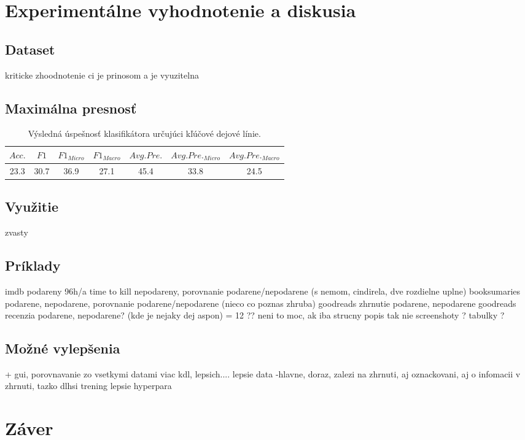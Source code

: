 \chapter{Experimentálne vyhodnotenie a diskusia}
\label{experimenty}


\section{Dataset}
kriticke zhoodnotenie ci je prinosom a je vyuzitelna

\section{Maximálna presnosť}

\begin{table}[hbt]
\centering
\caption{Výsledná úspešnosť klasifikátora určujúci kľúčové dejové línie.}
\label{vysledky}
\begin{tabular}{|c|c|c|c|c|c|c|}
\hline
\(Acc.\) & \(F1\) & \(F1_{Micro}\) & \(F1_{Macro}\) & \(Avg. Pre.\) & \(Avg. Pre._{Micro}\) &  \(Avg. Pre._{Macro}\) \\
\hline
23.3 & 30.7 & 36.9 & 27.1 & 45.4 & 33.8 & 24.5 \\ 
\hline

\end{tabular}
\end{table}

\section{Využitie}
zvasty


\section{Príklady}
imdb podareny 96h/a time to kill nepodareny, porovnanie podarene/nepodarene (s nemom, cindirela, dve rozdielne uplne)
booksumaries podarene, nepodarene, porovnanie podarene/nepodarene (nieco co poznas zhruba)
goodreads zhrnutie podarene, nepodarene
goodreads recenzia podarene, nepodarene? (kde je nejaky dej aspon)
= 12 ?? neni to moc, ak iba strucny popis tak nie
screenshoty ? tabulky ? 


\section{Možné vylepšenia}
+ gui, porovnavanie zo vsetkymi datami
viac kdl, lepsich....
lepsie data -hlavne, doraz, zalezi na zhrnuti, aj oznackovani, aj o infomacii v zhrnuti, tazko
dlhsi trening
lepsie hyperpara


\chapter{Záver}
\label{zaver}


